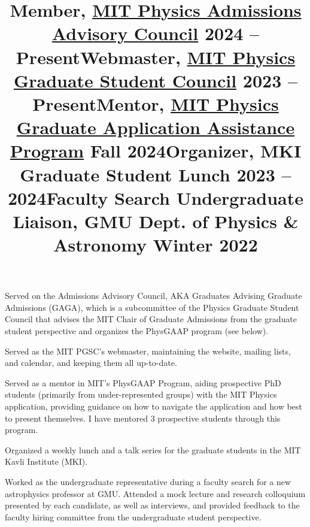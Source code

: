 \documentclass[marg, centered]{res}
\begin{document}
\begin{resume}
\vspace{-0.2cm}
\title{\textbf{Member}, \href{https://physics-gsc.scripts.mit.edu/home/gaga/}{\color{dkbu} MIT Physics Admissions Advisory Council} \hfill \textbf{2024 -- Present}}
\begin{position}
{\small Served on the Admissions Advisory Council, AKA Graduates Advising Graduate Admissions (GAGA), which is a subcommittee of the Physics Graduate Student Council that advises the MIT Chair of Graduate Admissions from the graduate student perspective and organizes the PhysGAAP program (see below).}
\end{position}

\vspace{-0.2cm}
\title{\textbf{Webmaster}, \href{https://physics-gsc.scripts.mit.edu/home/}{\color{dkbu} MIT Physics Graduate Student Council} \hfill \textbf{2023 -- Present}}
\begin{position}
{\small Served as the MIT PGSC's webmaster, maintaining the website, mailing lists, and calendar, and keeping them all up-to-date.}
\end{position}

\vspace{-0.2cm}
\title{\textbf{Mentor}, \href{https://sites.mit.edu/physgaap/}{\color{dkbu} MIT Physics Graduate Application Assistance Program} \hfill \textbf{Fall 2024}}
\begin{position}
{\small Served as a mentor in MIT's PhysGAAP Program, aiding prospective PhD students (primarily from under-represented groups) with the MIT Physics application, providing guidance on how to navigate the application and how best to present themselves.  I have mentored 3 prospective students through this program.}
\end{position}

\vspace{-0.2cm}
\title{\textbf{Organizer}, MKI Graduate Student Lunch \hfill \textbf{2023 -- 2024}}
\begin{position}
{\small Organized a weekly lunch and a talk series for the graduate students in the MIT Kavli Institute (MKI).}
\end{position}

\vspace{-0.2cm}
\title{\textbf{Faculty Search Undergraduate Liaison}, GMU Dept. of Physics \& Astronomy \hfill \textbf{Winter 2022}}
\begin{position}
{\small Worked as the undergraduate representative during a faculty search for a new astrophysics professor at GMU. Attended a mock lecture and research colloquium presented by each candidate, as well as interviews, and provided feedback to the faculty hiring committee from the undergraduate student perspective.}
\end{position}


\end{resume}
\end{document}
